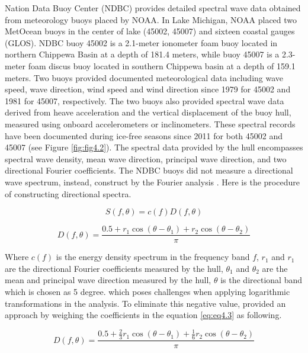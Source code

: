 Nation Data Buoy Center (NDBC) provides detailed spectral wave data obtained
from meteorology buoys placed by NOAA. In Lake Michigan, NOAA placed two
MetOcean buoys in the center of lake (45002, 45007) and sixteen coastal gauges
(GLOS). NDBC buoy 45002 is a 2.1-meter ionometer foam buoy located in northern
Chippewa Basin at a depth of 181.4 meters, while buoy 45007 is a 2.3-meter foam
discus buoy located in southern Chippewa basin at a depth of 159.1 meters. Two
buoys provided documented meteorological data including wave speed, wave
direction, wind speed and wind direction since 1979 for 45002 and 1981 for
45007, respectively. The two buoys also provided spectral wave data derived from
heave acceleration and the vertical displacement of the buoy hull, measured
using onboard accelerometers or inclinometers. These spectral records have been
documented during ice-free seasons since 2011 for both 45002 and 45007 (see
Figure \ref{fig:fig4.2}). The spectral data provided by the hull encompasses
spectral wave density, mean wave direction, principal wave direction, and two
directional Fourier coefficients. The NDBC buoys did not measure a directional
wave spectrum, instead, construct by the Fourier analysis
\citep{longuet-higgins_observations_1961}. Here is the procedure of constructing
directional spectra.

\begin{equation}
    S(f,\theta) = c(f)D(f,\theta)
\label{eq:eq4.2}
\end{equation}

\begin{equation}
    D(f,\theta)=\frac{0.5+r_1\cos(\theta-\theta_1)+r_2\cos(\theta-\theta_2)}{\pi}
\label{eq:eq4.3}
\end{equation}

Where $c(f)$ is the energy density spectrum in the frequency band $f$, $r_1$ and
$r_1$ are the directional Fourier coefficients measured by the hull, $\theta_1$
and $\theta_2$  are the mean and principal wave direction measured by the hull,
$\theta$ is the directional band which is chosen as 5 degree. which poses
challenges when applying logarithmic transformations in the analysis. To
eliminate this negative value, \citet{earle_use_1999} provided an approach by
weighing the coefficients in the equation \ref{eq:eq4.3} as following.

\begin{equation}
    D(f,\theta)=\frac{0.5+\frac{2}{3}r_1\cos(\theta-\theta_1)+\frac{1}{6}r_2\cos(\theta-\theta_2)}{\pi}
\label{eq:eq4.4}
\end{equation}

